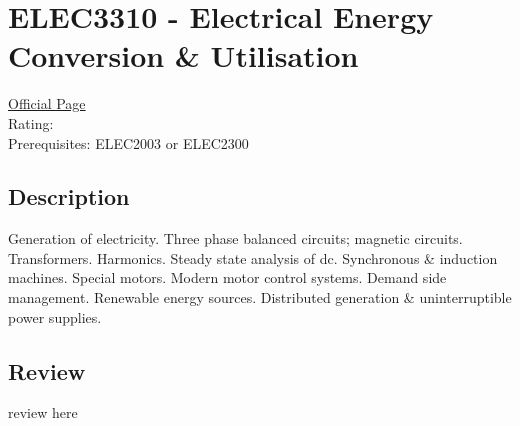 \hypertarget{ELEC3310}{\section{ELEC3310 - Electrical Energy Conversion \& Utilisation}}

\large
\textcolor{turbo_purple}{\href{https://my.uq.edu.au/programs-courses/course.html?course_code=ELEC3310}{Official Page}} \\
Rating: \cstar\cstar\cstar\cstar\ostar \\
Prerequisites: ELEC2003 or ELEC2300

\normalsize
\subsection*{Description}
Generation of electricity.
Three phase balanced circuits; magnetic circuits.
Transformers.
Harmonics.
Steady state analysis of dc.
Synchronous \& induction machines.
Special motors.
Modern motor control systems.
Demand side management.
Renewable energy sources.
Distributed generation \& uninterruptible power supplies.

\subsection*{Review}
review here
